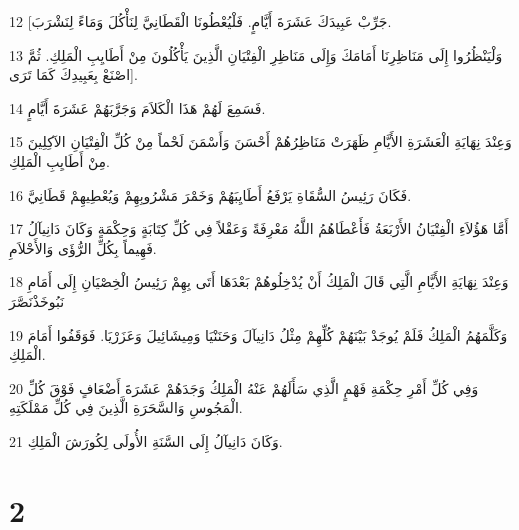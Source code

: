 \par 12 [جَرِّبْ عَبِيدَكَ عَشَرَةَ أَيَّامٍ. فَلْيُعْطُونَا الْقَطَانِيَّ لِنَأْكُلَ وَمَاءً لِنَشْرَبَ.
\par 13 وَلْيَنْظُرُوا إِلَى مَنَاظِرِنَا أَمَامَكَ وَإِلَى مَنَاظِرِ الْفِتْيَانِ الَّذِينَ يَأْكُلُونَ مِنْ أَطَايِبِ الْمَلِكِ. ثُمَّ اصْنَعْ بِعَبِيدِكَ كَمَا تَرَى].
\par 14 فَسَمِعَ لَهُمْ هَذَا الْكَلاَمَ وَجَرَّبَهُمْ عَشَرَةَ أَيَّامٍ.
\par 15 وَعِنْدَ نِهَايَةِ الْعَشَرَةِ الأَيَّامِ ظَهَرَتْ مَنَاظِرُهُمْ أَحْسَنَ وَأَسْمَنَ لَحْماً مِنْ كُلِّ الْفِتْيَانِ الآكِلِينَ مِنْ أَطَايِبِ الْمَلِكِ.
\par 16 فَكَانَ رَئِيسُ السُّقَاةِ يَرْفَعُ أَطَايِبَهُمْ وَخَمْرَ مَشْرُوبِهِمْ وَيُعْطِيهِمْ قَطَانِيَّ.
\par 17 أَمَّا هَؤُلاَءِ الْفِتْيَانُ الأَرْبَعَةُ فَأَعْطَاهُمُ اللَّهُ مَعْرِفَةً وَعَقْلاً فِي كُلِّ كِتَابَةٍ وَحِكْمَةٍ وَكَانَ دَانِيآلُ فَهِيماً بِكُلِّ الرُّؤَى وَالأَحْلاَمِ.
\par 18 وَعِنْدَ نِهَايَةِ الأَيَّامِ الَّتِي قَالَ الْمَلِكُ أَنْ يُدْخِلُوهُمْ بَعْدَهَا أَتَى بِهِمْ رَئِيسُ الْخِصْيَانِ إِلَى أَمَامِ نَبُوخَذْنَصَّرَ
\par 19 وَكَلَّمَهُمُ الْمَلِكُ فَلَمْ يُوجَدْ بَيْنَهُمْ كُلِّهِمْ مِثْلُ دَانِيآلَ وَحَنَنْيَا وَمِيشَائِيلَ وَعَزَرْيَا. فَوَقَفُوا أَمَامَ الْمَلِكِ.
\par 20 وَفِي كُلِّ أَمْرِ حِكْمَةِ فَهْمٍ الَّذِي سَأَلَهُمْ عَنْهُ الْمَلِكُ وَجَدَهُمْ عَشَرَةَ أَضْعَافٍ فَوْقَ كُلِّ الْمَجُوسِ وَالسَّحَرَةِ الَّذِينَ فِي كُلِّ مَمْلَكَتِهِ.
\par 21 وَكَانَ دَانِيآلُ إِلَى السَّنَةِ الأُولَى لِكُورَشَ الْمَلِكِ.

\chapter{2}

